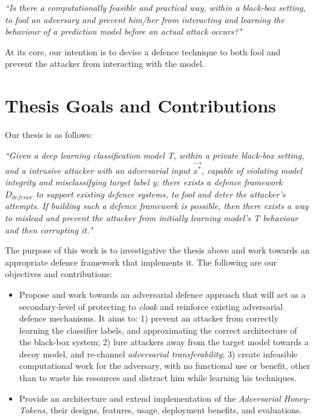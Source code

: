 \documentclass[grad,lot,lof,11pt,oneside,onehalfspace]{RUthesis}
\begin{document}
  \textit{``Is there a computationally feasible and practical way, within a black-box setting, to fool an adversary and prevent him/her from interacting and learning the behaviour of a prediction model before an actual attack occurs?"}
  
  At its core, our intention is to devise a defence technique to both fool and prevent the attacker from interacting with the model.
  
\section{Thesis Goals and Contributions}
Our thesis is as follows:

\textit{``Given a deep learning classification model \textit{T}, within a private black-box setting, and a intrusive attacker with an adversarial input $\vec{x^{*}}$, capable of violating model integrity and misclassifying target label \textit{y}; there exists a defence framework $D_{defence}$ to support existing defence systems, to fool and deter the attacker's attempts. If building such a defence framework is possible, then there exists a way to mislead and prevent the attacker from initially learning model's \textit{T} behaviour and then corrupting it."}

The purpose of this work is to investigative the thesis above and work towards an appropriate defence framework that implements it. The following are our objectives and contributions:
\begin{itemize}
	\item Propose and work towards an adversarial defence approach that will act as a secondary-level of protecting to \textit{cloak} and reinforce existing adversarial defence mechanisms. It aims to: 1) prevent an attacker from correctly learning the classifier labels, and approximating the correct architecture of the black-box system; 2) lure attackers away from the target model towards a decoy model, and re-channel \textit{adversarial transferability}; 3) create infeasible computational work for the adversary, with no functional use or benefit, other than to waste his resources and distract him while learning his techniques. 
	\item Provide an architecture and extend implementation of the \textit{Adversarial Honey-Tokens}, their designs, features, usage, deployment benefits, and evaluations.
\end{itemize}
\end{document}
